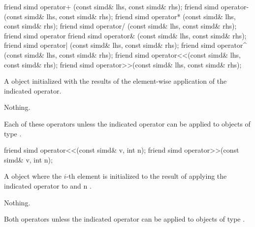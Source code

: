 
\begin{itemdecl}
friend simd operator+ (const simd& lhs, const simd& rhs);
friend simd operator- (const simd& lhs, const simd& rhs);
friend simd operator* (const simd& lhs, const simd& rhs);
friend simd operator/ (const simd& lhs, const simd& rhs);
friend simd operator%
friend simd operator& (const simd& lhs, const simd& rhs);
friend simd operator| (const simd& lhs, const simd& rhs);
friend simd operator^ (const simd& lhs, const simd& rhs);
friend simd operator<<(const simd& lhs, const simd& rhs);
friend simd operator>>(const simd& lhs, const simd& rhs);
\end{itemdecl}
\begin{itemdescr}
  \pnum\returns A \simd object initialized with the results of the element-wise application of the indicated operator.

  \pnum\throws Nothing.

  \pnum\remarks Each of these operators \specialsfinae unless the indicated operator can be applied to objects of type .
\end{itemdescr}

\begin{itemdecl}
friend simd operator<<(const simd& v, int n);
friend simd operator>>(const simd& v, int n);
\end{itemdecl}
\begin{itemdescr}
  \pnum\returns A \simd object where the $i$-th element is initialized to the result of applying the indicated operator to  and \code n \foralli.

  \pnum\throws Nothing.

  \pnum\remarks Both operators \specialsfinae unless the indicated operator can be applied to objects of type .
\end{itemdescr}

